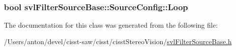 \subsubsection[{Loop}]{\setlength{\rightskip}{0pt plus 5cm}bool svl\+Filter\+Source\+Base\+::\+Source\+Config\+::\+Loop}\label{classsvl_filter_source_base_1_1_source_config_aab00181cb4a94ee89f364f50597f7c9e}


The documentation for this class was generated from the following file\+:\begin{DoxyCompactItemize}
\item 
/\+Users/anton/devel/cisst-\/saw/cisst/cisst\+Stereo\+Vision/\hyperlink{svl_filter_source_base_8h}{svl\+Filter\+Source\+Base.\+h}\end{DoxyCompactItemize}
